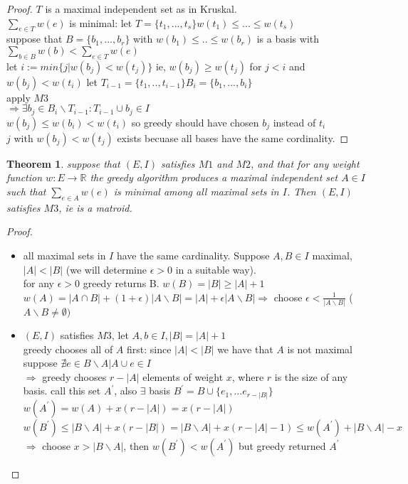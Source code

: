 \documentclass{article}
\newtheorem*{theorem}{Theorem}
\theoremstyle{definition}
\theoremstyle{remark}
\begin{document}
\begin{proof}
    $T$ is a maximal independent set as in Kruskal.\\
    $\sum_{e \in T}w(e)$ is minimal: let $T= \{t_1,...,t_s\} w(t_1) \leq ... \leq w(t_s)$\\
    suppose that $B=\{b_1,...,b_r\}$ with $w(b_1) \leq .. \leq w(b_r)$ is a basis with $\sum_{b \in B} w(b) < \sum_{e \in T}w(e)$\\
    let $i:= min\{j | w(b_j) < w(t_j)\}$ ie, $w(b_j) \geq w(t_j)$ for $j < i$ and $w(b_j) < w(t_i)$
    let $T_{i-1} = \{t_1,..,t_{i-1}\} B_i = \{b_1, ..., b_i\}$\\
    apply $M3$\\
    $\Rightarrow \exists b_j \in B_i \backslash T_{i-1}: T_{i-1} \cup b_j \in I$\\
    $w(b_j) \leq w(b_i) < w(t_i)$ so greedy should have chosen $b_j$ instead of $t_i$\\
    $j$ with $w(b_j) < w(t_j)$ exists becuase all bases have the same cordinality.
\end{proof}
\begin{theorem}
    suppose that $(E,I)$ satisfies $M1$ and $M2$, and that for any weight function $w: E \rightarrow \mathbb{R}$ the greedy algorithm produces a maximal independent set $A \in I$ such that $\sum_{e\in A}w(e)$ is minimal among all maximal sets in $I$. Then $(E,I)$ satisfies $M3$, ie is a matroid.
\end{theorem}
\begin{proof}
    $ $\\
    \begin{itemize}
        \item all maximal sets in $I$ have the same cardinality. Suppose $A,B \in I$ maximal, $|A|<|B|$
        (we will determine $\epsilon >0$ in a suitable way).\\ for any $\epsilon > 0$ greedy returns B. $w(B) = |B|\geq |A| + 1$ \\
        $w(A) = |A \cap B| + (1+\epsilon)|A\backslash B|=|A|+\epsilon|A\backslash B| \Rightarrow$ choose $\epsilon < \frac{1}{|A\backslash B|}$ ($A\backslash B \neq \emptyset )$
        \item $(E,I)$ satisfies $M3$, let $A,b \in I, |B|=|A|+1 $ \\%
        greedy chooses all of $A$ first: since $|A|<|B|$ we have that $A$ is not maximal\\ suppose $\nexists e \in B \backslash A | A \cup e \in I$\\
        $\Rightarrow$ greedy chooses $r-|A|$ elements of weight $x$, where $r$ is the size of any basis. call this set $A^\prime$, also $\exists$ basis $B^\prime=B\cup \{e_1,...e_{r-|B|}\}$ \\
        $w(A^\prime) = w(A) + x(r-|A|) = x(r-|A|)$\\
        $w(B^\prime)\leq |B\backslash A| + x(r-|B|)= |B\backslash A| + x(r-|A|-1) \leq w(A^\prime) + |B\backslash A|-x$\\
        $\Rightarrow$ choose $x > |B\backslash A|$, then $w(B^\prime) < w(A^\prime)$ but greedy returned $A^\prime$
    \end{itemize}
\end{proof}
\end{document}
